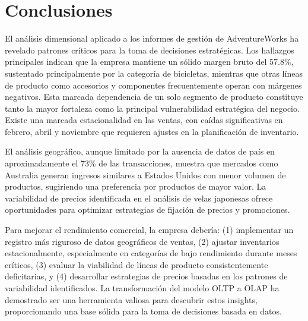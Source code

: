 \documentclass{article}
\begin{document}
\section{Conclusiones}

El análisis dimensional aplicado a los informes de gestión de AdventureWorks ha revelado patrones críticos para la toma de decisiones estratégicas. Los hallazgos principales indican que la empresa mantiene un sólido margen bruto del 57.8\%, sustentado principalmente por la categoría de bicicletas, mientras que otras líneas de producto como accesorios y componentes frecuentemente operan con márgenes negativos. Esta marcada dependencia de un solo segmento de producto constituye tanto la mayor fortaleza como la principal vulnerabilidad estratégica del negocio. Existe una marcada estacionalidad en las ventas, con caídas significativas en febrero, abril y noviembre que requieren ajustes en la planificación de inventario.

El análisis geográfico, aunque limitado por la ausencia de datos de país en aproximadamente el 73\% de las transacciones, muestra que mercados como Australia generan ingresos similares a Estados Unidos con menor volumen de productos, sugiriendo una preferencia por productos de mayor valor. La variabilidad de precios identificada en el análisis de velas japonesas ofrece oportunidades para optimizar estrategias de fijación de precios y promociones.

Para mejorar el rendimiento comercial, la empresa debería: (1) implementar un registro más riguroso de datos geográficos de ventas, (2) ajustar inventarios estacionalmente, especialmente en categorías de bajo rendimiento durante meses críticos, (3) evaluar la viabilidad de líneas de producto consistentemente deficitarias, y (4) desarrollar estrategias de precios basadas en los patrones de variabilidad identificados. La transformación del modelo OLTP a OLAP ha demostrado ser una herramienta valiosa para descubrir estos insights, proporcionando una base sólida para la toma de decisiones basada en datos.



\end{document}
